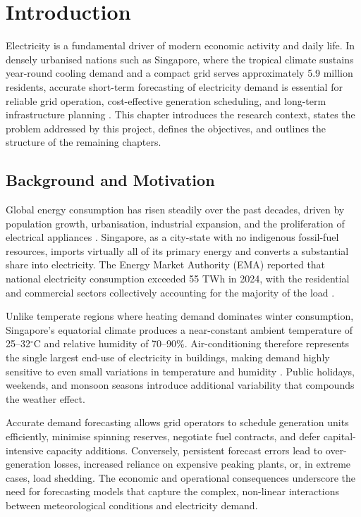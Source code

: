 \chapter{Introduction}\label{ch:Introduction}
 \setcounter{page}{1}

Electricity is a fundamental driver of modern economic activity and daily life. In densely urbanised nations such as Singapore, where the tropical climate sustains year-round cooling demand and a compact grid serves approximately 5.9 million residents, accurate short-term forecasting of electricity demand is essential for reliable grid operation, cost-effective generation scheduling, and long-term infrastructure planning \parencite{ema2025statistics}. This chapter introduces the research context, states the problem addressed by this project, defines the objectives, and outlines the structure of the remaining chapters.


\section{Background and Motivation}

Global energy consumption has risen steadily over the past decades, driven by population growth, urbanisation, industrial expansion, and the proliferation of electrical appliances \parencite{ringkjob2018review}. Singapore, as a city-state with no indigenous fossil-fuel resources, imports virtually all of its primary energy and converts a substantial share into electricity. The Energy Market Authority (EMA) reported that national electricity consumption exceeded 55 TWh in 2024, with the residential and commercial sectors collectively accounting for the majority of the load \parencite{ema2025statistics}.

Unlike temperate regions where heating demand dominates winter consumption, Singapore's equatorial climate produces a near-constant ambient temperature of 25--32$^\circ$C and relative humidity of 70--90\%. Air-conditioning therefore represents the single largest end-use of electricity in buildings, making demand highly sensitive to even small variations in temperature and humidity \parencite{zhao2012review}. Public holidays, weekends, and monsoon seasons introduce additional variability that compounds the weather effect.

Accurate demand forecasting allows grid operators to schedule generation units efficiently, minimise spinning reserves, negotiate fuel contracts, and defer capital-intensive capacity additions. Conversely, persistent forecast errors lead to over-generation losses, increased reliance on expensive peaking plants, or, in extreme cases, load shedding. The economic and operational consequences underscore the need for forecasting models that capture the complex, non-linear interactions between meteorological conditions and electricity demand.


